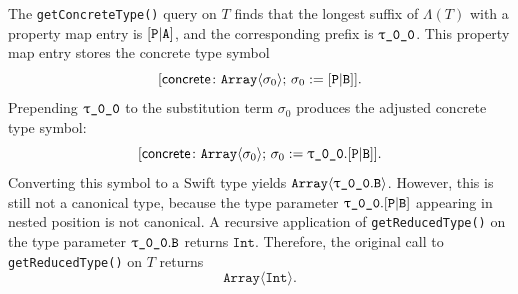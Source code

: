 \documentclass[../generics]{subfiles}
\begin{document}
\begin{example}
The \texttt{getConcreteType()} query on $T$ finds that the longest suffix of $\Lambda(T)$ with a property map entry is $[\texttt{P}|\texttt{A}]$, and the corresponding prefix is $\rT$. This property map entry stores the concrete type symbol
\[[\mathsf{concrete}\colon \texttt{Array}\langle\sigma_0\rangle;\,\sigma_0:=[\texttt{P}|\texttt{B}]].\]
Prepending $\rT$ to the substitution term $\sigma_0$ produces the adjusted concrete type symbol:
\[\concretesym{\texttt{Array}\langle\sigma_0\rangle;\,\sigma_0:=\rT.\assocsym{P}{B}}.\]
Converting this symbol to a Swift type yields $\texttt{Array}\langle\rT.\nB\rangle$. However, this is still not a canonical type, because the type parameter $\rT.\assocsym{P}{B}$ appearing in nested position is not canonical. A recursive application of \texttt{getReducedType()} on the type parameter $\rT.\nB$ returns $\texttt{Int}$. Therefore, the original call to \texttt{getReducedType()} on $T$ returns
\[\texttt{Array}\langle\texttt{Int}\rangle.\]
\end{example}
\end{document}
